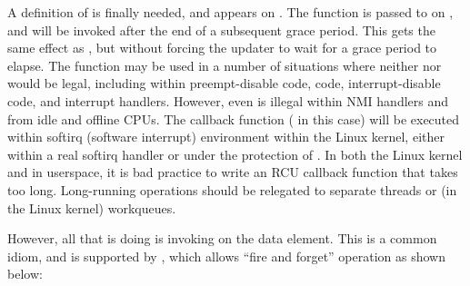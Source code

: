 \begin{fcvref}
A definition of  is finally needed, and appears on
. %
The function  is passed to 
on , %
and will be invoked after the end of a subsequent grace
period.
This gets the same effect as , but
without forcing the updater to wait for a grace period to elapse.
The
 function may be used in a number of situations where
neither  nor  would
be legal, including within preempt-disable code, 
code, interrupt-disable code, and interrupt handlers.
However, even
 is illegal within NMI handlers and from idle and offline
CPUs.
The callback function ( in this case) will be
executed within softirq (software interrupt) environment within the
Linux kernel, either within a real softirq handler or under the
protection of .
In both the Linux kernel and in
userspace, it is bad practice to write an RCU callback function that
takes too long.
Long-running operations should be relegated to separate
threads or (in the Linux kernel) workqueues.
\end{fcvref}

\QuickQuizEnd

However, all that  is doing is invoking  on
the data element.
This is a common idiom, and is supported by
, which allows ``fire and forget'' operation as shown
below:

